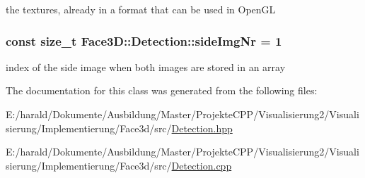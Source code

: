 the textures, already in a format that can be used in Open\+GL 

\subsubsection[{\texorpdfstring{side\+Img\+Nr}{sideImgNr}}]{\setlength{\rightskip}{0pt plus 5cm}const size\+\_\+t Face3\+D\+::\+Detection\+::side\+Img\+Nr = 1\hspace{0.3cm}{\ttfamily [private]}}\hypertarget{class_face3_d_1_1_detection_a7a2e671e0ba9133f1fd8e877bc5a89f9}{}\label{class_face3_d_1_1_detection_a7a2e671e0ba9133f1fd8e877bc5a89f9}


index of the side image when both images are stored in an array 



The documentation for this class was generated from the following files\+:\begin{DoxyCompactItemize}
\item 
E\+:/harald/\+Dokumente/\+Ausbildung/\+Master/\+Projekte\+C\+P\+P/\+Visualisierung2/\+Visualisierung/\+Implementierung/\+Face3d/src/\hyperlink{_detection_8hpp}{Detection.\+hpp}\item 
E\+:/harald/\+Dokumente/\+Ausbildung/\+Master/\+Projekte\+C\+P\+P/\+Visualisierung2/\+Visualisierung/\+Implementierung/\+Face3d/src/\hyperlink{_detection_8cpp}{Detection.\+cpp}\end{DoxyCompactItemize}

